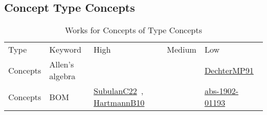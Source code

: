 \clearpage
\subsection{Concept Type Concepts}
\label{sec:Concepts}
{\scriptsize
\begin{longtable}{lp{3cm}>{\raggedright\arraybackslash}p{6cm}>{\raggedright\arraybackslash}p{6cm}>{\raggedright\arraybackslash}p{8cm}}
\rowcolor{white}\caption{Works for Concepts of Type Concepts}\\ \toprule
\rowcolor{white}Type & Keyword & High & Medium & Low\\ \midrule\endhead
\bottomrule
\endfoot
Concepts & Allen's algebra &  &  & \href{works/DechterMP91.pdf}{DechterMP91}~\cite{DechterMP91}\\
Concepts & BOM & \href{works/SubulanC22.pdf}{SubulanC22}~\cite{SubulanC22}, \href{works/HartmannB10.pdf}{HartmannB10}~\cite{HartmannB10} &  & \href{works/abs-1902-01193.pdf}{abs-1902-01193}~\cite{abs-1902-01193}\\

\end{longtable}}
